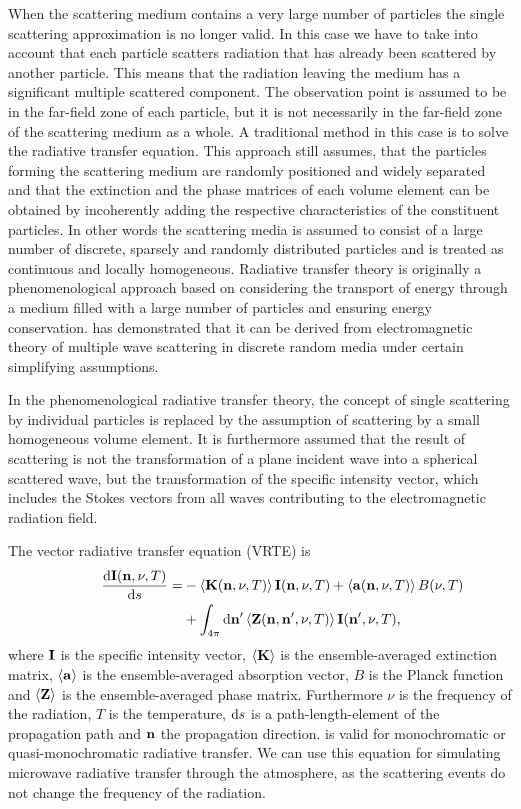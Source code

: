 When the scattering medium contains a very large number of particles
the single scattering approximation is no longer valid. In this case
we have to take into account that each particle scatters radiation
that has already been scattered by another particle. This means that
the radiation leaving the medium has a significant multiple scattered
component. The observation point is assumed to be in the far-field
zone of each particle, but it is not necessarily in the far-field zone
of the scattering medium as a whole. A traditional method in this case
is to solve the radiative transfer equation.  This approach still
assumes, that the particles forming the scattering medium are randomly
positioned and widely separated and that the extinction and the phase
matrices of each volume element can be obtained by incoherently adding
the respective characteristics of the constituent particles. In other
words the scattering media is assumed to consist of a large number of
discrete, sparsely and randomly distributed particles and is treated
as continuous and locally homogeneous.  Radiative transfer theory is
originally a phenomenological approach based on considering the
transport of energy through a medium filled with a large number of
particles and ensuring energy conservation.
\citet{mishchenko02:_vector} has demonstrated that it can be derived
from electromagnetic theory of multiple wave scattering in discrete
random media under certain simplifying assumptions.

In the phenomenological radiative transfer theory, the concept of
single scattering by individual particles is replaced by the
assumption of scattering by a small homogeneous volume element. It is
furthermore assumed that the result of scattering is not the
transformation of a plane incident wave into a spherical scattered
wave, but the transformation of the specific intensity vector, which
includes the Stokes vectors from all waves contributing to the
electromagnetic radiation field.

The vector radiative transfer equation (VRTE) is
\begin{eqnarray}
  \frac {\DiffD\StoVec(\PDir, \nu, T)}{\DiffD s} =
    &{}-\EnsAvr{\ExtMat(\PDir, \nu, T)} \StoVec(\PDir, \nu, T) +
    \EnsAvr{\AbsVec(\PDir, \nu, T)} \rlap{$B(\nu, T)$} \nonumber \\
    &{}+ \int_{4\pi} \DiffD\PDir' \EnsAvr{\PhaMat(\PDir, \PDir', \nu, T)} \StoVec(\PDir', \nu, T),
  \label{eq:rtetheory:VRTE}
  \end{eqnarray}
where ${\bf I}$ is the specific intensity vector, $\left\langle {\bf K} \right\rangle$ is the ensemble-averaged extinction matrix, $\left\langle {\bf a} \right\rangle$ is the ensemble-averaged absorption vector, $B$ is the
Planck function and $\left\langle {\bf Z} \right\rangle$ is the ensemble-averaged
phase matrix.  Furthermore $\nu$ is the frequency of the radiation,
$T$ is the temperature, $\mathrm{d} s$ is a path-length-element of the
propagation path and ${\bf n}$ the propagation direction.
 is valid for monochromatic or quasi-monochromatic
radiative transfer. We can use this equation for simulating microwave
radiative transfer through the atmosphere, as the scattering events do
not change the frequency of the radiation.

